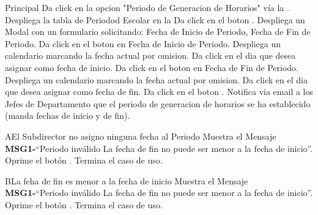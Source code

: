 	\begin{UCtrayectoria}{Principal}
		\UCpaso[\UCactor] Da click en la opcion "Periodo de Generacion de Horarios" vía la \label{CULogin}.
		\UCpaso           Despliega la tabla de Periodod Escolar en la 
		\UCpaso[\UCactor] Da click en el boton .
		\UCpaso           Despliega un Modal con un formulario solicitando: Fecha de Inicio de Periodo, Fecha de Fin de Periodo.
		\UCpaso[\UCactor] Da click en el boton  en Fecha de Inicio de Periodo.
		\UCpaso           Despliega un calendario marcando la fecha actual por omision.
		\UCpaso[\UCactor] Da click en el dia que desea asignar como fecha de inicio.     
		\UCpaso[\UCactor] Da click en el boton  en Fecha de Fin de Periodo.
		\UCpaso           Despliega un calendario marcando la fecha actual por omision.
		\UCpaso[\UCactor] Da click en el dia que desea asignar como fecha de fin.     
		\UCpaso[\UCactor] Da click en el boton .
		\UCpaso           Notifica via email a los Jefes de Departamento que el periodo de generacion de horarios se ha establecido (manda fechas de inicio y de fin).
	\end{UCtrayectoria}
    
	\begin{UCtrayectoriaA}{A}{El Subdirector no asigno ninguna fecha al Periodo}
		\UCpaso 	  Muestra el Mensaje {\bf MSG1-}``Periodo inválido La fecha de fin no puede ser menor a la fecha de inicio''.
		\UCpaso[\UCactor] Oprime el botón .
		\UCpaso[] Termina el caso de uso.
	\end{UCtrayectoriaA}

	\begin{UCtrayectoriaA}{B}{La feha de fin es menor a la fecha de inicio}
		\UCpaso 	  Muestra el Mensaje {\bf MSG1-}``Periodo inválido La fecha de fin no puede ser menor a la fecha de inicio''.
		\UCpaso[\UCactor] Oprime el botón .
		\UCpaso[] Termina el caso de uso.
	\end{UCtrayectoriaA}
